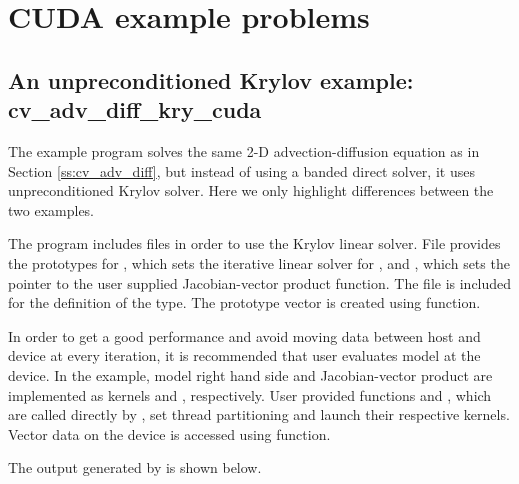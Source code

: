 \section{CUDA example problems}\label{s:ex_cuda}



\subsection{An unpreconditioned Krylov example: cv\_adv\_diff\_kry\_cuda}\label{ss:cv_adv_diff_cuda}

The example program  solves the same 2-D
advection-diffusion equation as in Section \ref{ss:cv_adv_diff}, but
instead of using a banded direct solver, it uses unpreconditioned 
Krylov solver. Here we only highlight differences between the two 
examples. 

The  program includes files
 in order to use the {\spgmr}
Krylov linear solver. File  provides the prototypes for 
, which sets the iterative linear solver for
{\cvode}, and , which sets the pointer to the user
supplied Jacobian-vector product function.
The file  is included for the definition of the {\cuda}
 type. The prototype vector is created
using  function. 

In order to get a good performance and avoid moving data between host
and device at every iteration, it is recommended that user evaluates  
model at the device. In the example, model right hand side and Jacobian-vector
product are implemented as {\cuda} kernels  and ,
respectively. User provided {\CC} functions  and , which are called
directly by {\cvode}, set thread partitioning and launch their respective 
{\cuda} kernels. Vector data on the device is accessed using 
 function.

The output generated by  is shown below.


